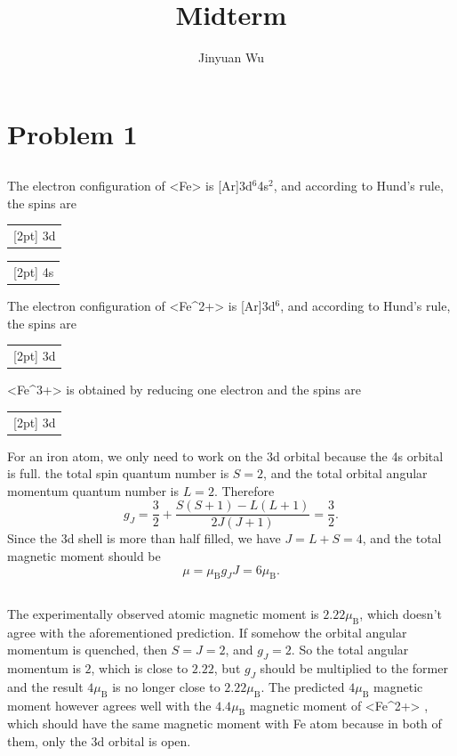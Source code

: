 \documentclass[hyperref, a4paper]{article}
\title{Midterm}
\author{Jinyuan Wu}
\def\\{}%
\def\ce#1{<#1>}%
\newcommand*{\muB}{\mu_{\text{B}}}
\newcommand*\up{\fbox{$\mathord\upharpoonleft\phantom{\downharpoonright}$}}%
\newcommand*\updn{\fbox{$\upharpoonleft\downharpoonright$}}%
\newcommand{\electron}[2]{{%
        \setlength\tabcolsep{0pt}%
        \begin{tabular}{c}
            \fboxsep=0pt\fbox{\fboxsep=3pt#2}\\[2pt]
            #1
        \end{tabular}%
}}
\begin{document}
\maketitle

\section{Problem 1}

\subsection{}

The electron configuration of \ce{Fe} is [Ar]3d$^6$4s$^2$,
and according to Hund's rule, 
the spins are 
\begin{center}
    \electron{3d}{\updn \up \up \up \up} \electron{4s}{\updn}
\end{center}
The electron configuration of \ce{Fe^{2+}} is [Ar]3d$^6$,
and according to Hund's rule, 
the spins are 
\begin{center}  
    \electron{3d}{\updn \up \up \up \up}
\end{center}
\ce{Fe^{3+}} is obtained by reducing one electron and the spins are 
\begin{center}
    \electron{3d}{\up \up \up \up \up}
\end{center}

For an iron atom,
we only need to work on the 3d orbital 
because the 4s orbital is full.
the total spin quantum number is $S = 2$,
and the total orbital angular momentum quantum number is $L = 2$.
Therefore 
\begin{equation}
    g_J = \frac{3}{2} + \frac{S(S+1) - L(L+1)}{2J(J+1)} = \frac{3}{2}.
\end{equation}
Since the 3d shell is more than half filled, 
we have $J = L + S = 4$,
and the total magnetic moment should be 
\begin{equation}
    \mu = \muB g_J J = 6 \muB.
\end{equation}

\subsection{}

The experimentally observed atomic magnetic moment is $2.22\muB$,
which doesn't agree with the aforementioned prediction.
If somehow the orbital angular momentum is quenched, 
then $S = J = 2$,
and $g_J = 2$.
So the total angular momentum is $2$, which is close to $2.22$,
but $g_J$ should be multiplied to the former
and the result $4 \muB$ is no longer close to $2.22 \muB$.
The predicted $4 \muB$ magnetic moment however 
agrees well with the $4.4 \muB$ magnetic moment 
of \ce{Fe^{2+}} \cite{PhysRevB.63.172404},
which should have the same magnetic moment with Fe atom
because in both of them, only the 3d orbital is open.
\end{document}
